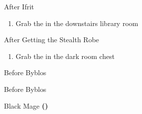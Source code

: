 \begin{paracol}{2}
\switchcolumn
\begin{steproute}{After Ifrit}
\end{steproute}

\switchcolumn
\begin{enumerate}[resume]
    \item Grab the  in the downstairs library room
\end{enumerate}

\switchcolumn
\begin{steproute}{After Getting the Stealth Robe}
\end{steproute}

\switchcolumn
\resume
\begin{enumerate}[resume]
    \item Grab the  in the dark room chest
\end{enumerate}

\switchcolumn*
\begin{steproute}{Before Byblos}
\end{steproute}

\switchcolumn
\begin{menu}{Before Byblos}
    \varwb
    \begin{itemMenu}
        \phoenixDownMenu {}
    \end{itemMenu}
    \begin{magicMenu}
        \faris \cure \space \then {}
    \end{magicMenu}
    \begin{jobMenu}
        \faris Black Mage \textbf{(\pointDown)}
    \end{jobMenu}
    \varwe
\end{menu}


\end{paracol}
